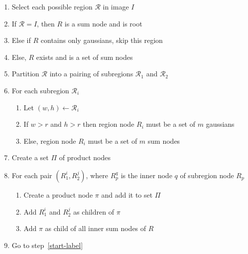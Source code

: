 \documentclass{amsart}
\newcommand{\region}{\mathcal}
\theoremstyle{plain}
\numberwithin{equation}{section}
\begin{document}
\begin{enumerate}[label=\arabic*.]
  \item\label{start-label} Select each possible region $\region{R}$ in image $I$
  \item If $\region{R} = I$, then $R$ is a sum node and is root
  \item Else if $R$ contains only gaussians, skip this region
  \item Else, $R$ exists and is a set of sum nodes
  \item Partition $\region{R}$ into a pairing of subregions $\region{R}_1$ and $\region{R}_2$
  \item For each subregion $\region{R}_i$
    \begin{enumerate}[label*=\arabic*.]
      \item Let $(w, h) \gets \region{R}_i$
      \item If $w > r$ and $h > r$ then region node $R_i$ must be a set of $m$ gaussians
      \item Else, region node $R_i$ must be a set of $m$ sum nodes
    \end{enumerate}
  \item Create a set $\Pi$ of product nodes
  \item For each pair $(R_1^i, R_2^j)$, where $R_p^q$ is the inner node $q$ of subregion node $R_p$
    \begin{enumerate}[label*=\arabic*.]
      \item Create a product node $\pi$ and add it to set $\Pi$
      \item Add $R_1^i$ and $R_2^j$ as children of $\pi$
      \item Add $\pi$ as child of all inner sum nodes of $R$
    \end{enumerate}
  \item Go to step~\ref{start-label}
\end{enumerate}
\end{document}
